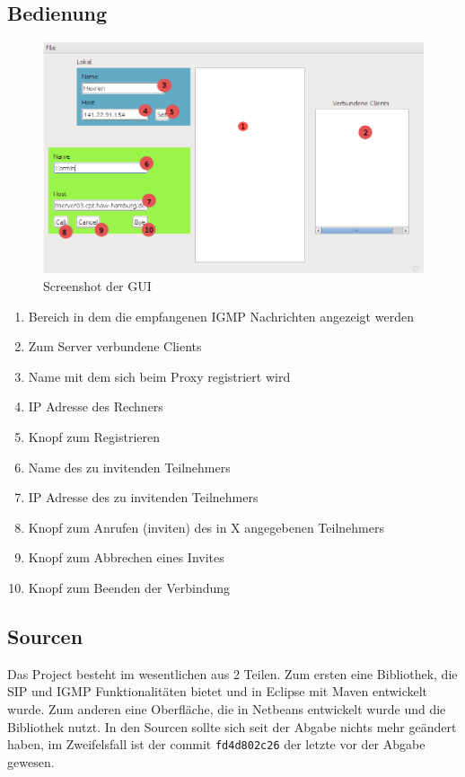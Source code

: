 \documentclass[10pt]{scrartcl}
\begin{document}
\subsection{Bedienung}
\label{sec:bedienung:anwendung}		
	\begin{figure}[H]
        \centering
                \includegraphics[width=\textwidth]{img/screenshotApplication}
        \caption{Screenshot der GUI}
        \label{img:gui}
	\end{figure}

\begin{enumerate}
	\item Bereich in dem die empfangenen IGMP Nachrichten angezeigt werden
	\item Zum Server verbundene Clients
	\item Name mit dem sich beim Proxy registriert wird
	\item IP Adresse des Rechners
	\item Knopf zum Registrieren
	\item Name des zu invitenden Teilnehmers
	\item IP Adresse des zu invitenden Teilnehmers
	\item Knopf zum Anrufen (inviten) des in X angegebenen Teilnehmers
	\item Knopf zum Abbrechen eines Invites
	\item Knopf zum Beenden der Verbindung
\end{enumerate}

\subsection{Sourcen}
Das Project besteht im wesentlichen aus 2 Teilen. Zum ersten eine Bibliothek, die SIP und IGMP Funktionalitäten bietet und in Eclipse mit Maven entwickelt wurde. Zum anderen eine Oberfläche, die in Netbeans entwickelt wurde und die Bibliothek nutzt. In den Sourcen sollte sich seit der Abgabe nichts mehr geändert haben, im Zweifelsfall ist der commit \verb!fd4d802c26! der letzte vor der Abgabe gewesen.
\end{document}
